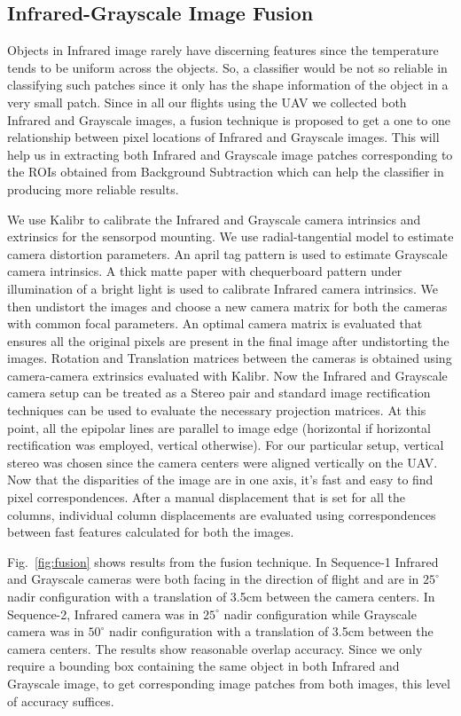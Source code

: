 \documentclass[runningheads]{llncs}
\begin{document}
\subsection{Infrared-Grayscale Image Fusion} 

Objects in Infrared image rarely have discerning features since the temperature tends to be uniform across the objects. So, a classifier would be not so reliable in classifying such patches since it only has the shape information of the object in a very small patch. Since in all our flights using the UAV we collected both Infrared and Grayscale images, a fusion technique is proposed to get a one to one relationship between pixel locations of Infrared and Grayscale images. This will help us in extracting both Infrared and Grayscale image patches corresponding to the ROIs obtained from Background Subtraction which can help the classifier in producing more reliable results.

We use Kalibr \cite{furgale2013unified} to calibrate the Infrared and Grayscale camera intrinsics and extrinsics for the sensorpod mounting. We use radial-tangential model to estimate camera distortion parameters. An april tag pattern is used to estimate Grayscale camera intrinsics. A thick matte paper with chequerboard pattern under illumination of a bright light is used to calibrate Infrared camera intrinsics. We then undistort the images and choose a new camera matrix for both the cameras with common focal parameters. An optimal camera matrix is evaluated that ensures all the original pixels are present in the final image after undistorting the images. Rotation and Translation matrices between the cameras is obtained using camera-camera extrinsics evaluated with Kalibr. Now the Infrared and Grayscale camera setup can be treated as a Stereo pair and standard image rectification techniques \cite{planar_rect} can be used to evaluate the necessary projection matrices. At this point, all the epipolar lines are parallel to image edge (horizontal if horizontal rectification was employed, vertical otherwise). For our particular setup, vertical stereo was chosen since the camera centers were aligned vertically on the UAV. Now that the disparities of the image are in one axis, it's fast and easy to find pixel correspondences. After a manual displacement that is set for all the columns, individual column displacements are evaluated using correspondences between fast features calculated for both the images.


Fig.~\ref{fig:fusion} shows results from the fusion technique. In Sequence-1 Infrared and Grayscale cameras were both facing in the direction of flight and are in $25^{\circ}$ nadir configuration with a translation of 3.5cm between the camera centers. In Sequence-2, Infrared camera was in $25^{\circ}$ nadir configuration while Grayscale camera was in $50^{\circ}$ nadir configuration with a translation of 3.5cm between the camera centers. The results show reasonable overlap accuracy. Since we only require a bounding box containing the same object in both Infrared and Grayscale image, to get corresponding image patches from both images, this level of accuracy suffices.
\end{document}
